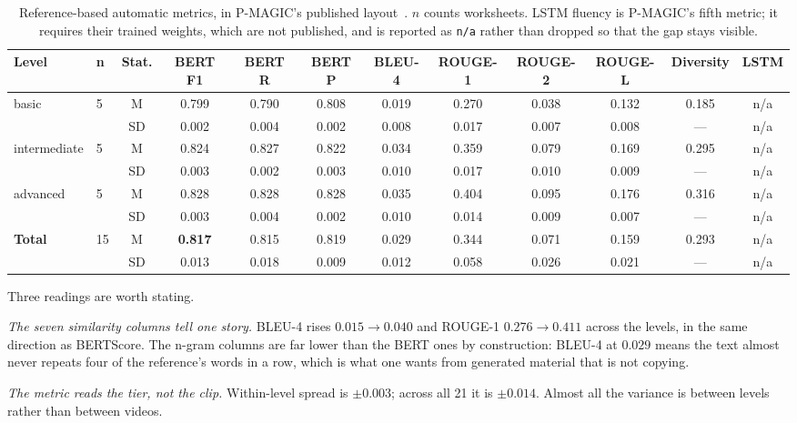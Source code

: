 \documentclass[conference]{IEEEtran}
\begin{document}
\begin{table}[t]
\caption{Reference-based automatic metrics, in P-MAGIC's published
layout~\cite{pmagic}. $n$ counts worksheets. LSTM fluency is P-MAGIC's fifth
metric; it requires their trained weights, which are not published, and is
reported as \texttt{n/a} rather than dropped so that the gap stays visible.}
\label{tab:auto}
\centering
\footnotesize
\begin{tabular}{@{}llcccccccccc@{}}
\toprule
\textbf{Level} & \textbf{n} & \textbf{Stat.} & \textbf{BERT F1} & \textbf{BERT R} & \textbf{BERT P} & \textbf{BLEU-4} & \textbf{ROUGE-1} & \textbf{ROUGE-2} & \textbf{ROUGE-L} & \textbf{Diversity} & \textbf{LSTM} \\
\midrule
basic & 5 & M & 0.799 & 0.790 & 0.808 & 0.019 & 0.270 & 0.038 & 0.132 & 0.185 & n/a \\
 & & SD & 0.002 & 0.004 & 0.002 & 0.008 & 0.017 & 0.007 & 0.008 & --- & n/a \\
\addlinespace[2pt]
intermediate & 5 & M & 0.824 & 0.827 & 0.822 & 0.034 & 0.359 & 0.079 & 0.169 & 0.295 & n/a \\
 & & SD & 0.003 & 0.002 & 0.003 & 0.010 & 0.017 & 0.010 & 0.009 & --- & n/a \\
\addlinespace[2pt]
advanced & 5 & M & 0.828 & 0.828 & 0.828 & 0.035 & 0.404 & 0.095 & 0.176 & 0.316 & n/a \\
 & & SD & 0.003 & 0.004 & 0.002 & 0.010 & 0.014 & 0.009 & 0.007 & --- & n/a \\
\addlinespace[2pt]
\textbf{Total} & 15 & M & \textbf{0.817} & 0.815 & 0.819 & 0.029 & 0.344 & 0.071 & 0.159 & 0.293 & n/a \\
 & & SD & 0.013 & 0.018 & 0.009 & 0.012 & 0.058 & 0.026 & 0.021 & --- & n/a \\
\bottomrule
\end{tabular}
\end{table}

Three readings are worth stating.

\emph{The seven similarity columns tell one story.} BLEU-4 rises
$0.015 \rightarrow 0.040$ and ROUGE-1 $0.276 \rightarrow 0.411$ across the
levels, in the same direction as BERTScore. The n-gram columns are far lower
than the BERT ones by construction: BLEU-4 at $0.029$ means the text almost
never repeats four of the reference's words in a row, which is what one wants
from generated material that is not copying.

\emph{The metric reads the tier, not the clip.} Within-level spread is
$\pm0.003$; across all 21 it is $\pm0.014$. Almost all the variance is between
levels rather than between videos.
\end{document}
